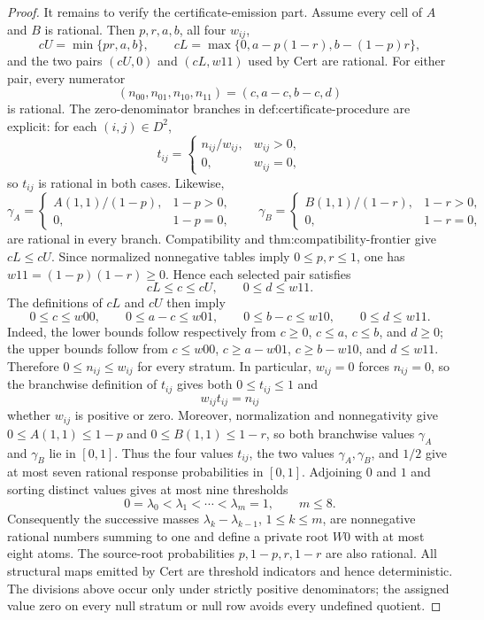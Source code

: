 \documentclass{article}
\begin{document}
\begin{proof}
It remains to verify the certificate-emission part.  Assume every cell of \(A\) and \(B\) is rational.  Then \(p,r,a,b\), all four \(w_{ij}\),
\[
cU=\min\{pr,a,b\},\qquad
cL=\max\{0,a-p(1-r),b-(1-p)r\},
\]
and the two pairs \((cU,0)\) and \((cL,w11)\) used by \(\mathrm{Cert}\) are rational.  For either pair, every numerator
\[
(n_{00},n_{01},n_{10},n_{11})=(c,a-c,b-c,d)
\]
is rational.  The zero-denominator branches in \(\text{def:certificate-procedure}\) are explicit: for each \((i,j)\in D^2\),
\[
t_{ij}=
\begin{cases}
n_{ij}/w_{ij},&w_{ij}>0,\\
0,&w_{ij}=0,
\end{cases}
\]
so \(t_{ij}\) is rational in both cases.  Likewise,
\[
\gamma_A=
\begin{cases}
A(1,1)/(1-p),&1-p>0,\\
0,&1-p=0,
\end{cases}
\qquad
\gamma_B=
\begin{cases}
B(1,1)/(1-r),&1-r>0,\\
0,&1-r=0,
\end{cases}
\]
are rational in every branch.  Compatibility and \(\text{thm:compatibility-frontier}\) give \(cL\le cU\).  Since normalized nonnegative tables imply \(0\le p,r\le1\), one has \(w11=(1-p)(1-r)\ge0\).  Hence each selected pair satisfies
\[
cL\le c\le cU,\qquad 0\le d\le w11.
\]
The definitions of \(cL\) and \(cU\) then imply
\[
0\le c\le w00,\qquad
0\le a-c\le w01,\qquad
0\le b-c\le w10,\qquad
0\le d\le w11.
\]
Indeed, the lower bounds follow respectively from \(c\ge0\), \(c\le a\), \(c\le b\), and \(d\ge0\); the upper bounds follow from \(c\le w00\), \(c\ge a-w01\), \(c\ge b-w10\), and \(d\le w11\).  Therefore \(0\le n_{ij}\le w_{ij}\) for every stratum.  In particular, \(w_{ij}=0\) forces \(n_{ij}=0\), so the branchwise definition of \(t_{ij}\) gives both \(0\le t_{ij}\le1\) and
\[
w_{ij}t_{ij}=n_{ij}
\]
whether \(w_{ij}\) is positive or zero.  Moreover, normalization and nonnegativity give \(0\le A(1,1)\le1-p\) and \(0\le B(1,1)\le1-r\), so both branchwise values \(\gamma_A\) and \(\gamma_B\) lie in \([0,1]\).  Thus the four values \(t_{ij}\), the two values \(\gamma_A,\gamma_B\), and \(1/2\) give at most seven rational response probabilities in \([0,1]\).  Adjoining \(0\) and \(1\) and sorting distinct values gives at most nine thresholds
\[
0=\lambda_0<\lambda_1<\cdots<\lambda_m=1,
\qquad m\le 8.
\]
Consequently the successive masses \(\lambda_k-\lambda_{k-1}\), \(1\le k\le m\), are nonnegative rational numbers summing to one and define a private root \(W0\) with at most eight atoms.  The source-root probabilities \(p,1-p,r,1-r\) are also rational.  All structural maps emitted by \(\mathrm{Cert}\) are threshold indicators and hence deterministic.  The divisions above occur only under strictly positive denominators; the assigned value zero on every null stratum or null row avoids every undefined quotient.


\end{proof}
\end{document}
